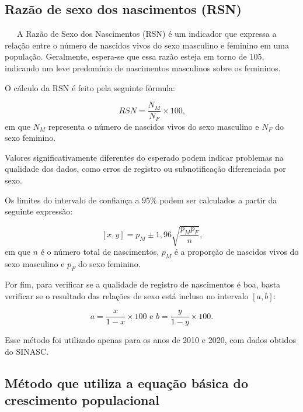 \documentclass[
  12pt,
  a4paper,
]{scrreprt}
\begin{document}
\subsection{Razão de sexo dos nascimentos
(RSN)}\label{razuxe3o-de-sexo-dos-nascimentos-rsn}

~~~A Razão de Sexo dos Nascimentos (RSN) é um indicador que expressa a
relação entre o número de nascidos vivos do sexo masculino e feminino em
uma população. Geralmente, espera-se que essa razão esteja em torno de
105, indicando um leve predomínio de nascimentos masculinos sobre os
femininos.

\vspace{12pt}

O cálculo da RSN é feito pela seguinte fórmula:

\[
RSN = \frac{N_M}{N_F} \times 100 \text{,}
\] em que \(N_M\) representa o número de nascidos vivos do sexo
masculino e \(N_F\) do sexo feminino.

\vspace{12pt}

Valores significativamente diferentes do esperado podem indicar
problemas na qualidade dos dados, como erros de registro ou
subnotificação diferenciada por sexo.

\vspace{12pt}

Os limites do intervalo de confiança a \(95\%\) podem ser calculados a
partir da seguinte expressão:

\[
\left[x, y\right] = p_{M} \pm 1,96 \sqrt{\frac{p_{M}p_{F}}{n}} \text{,}
\] em que \(n\) é o número total de nascimentos, \(p_{M}\) é a proporção
de nascidos vivos do sexo masculino e \(p_{F}\) do sexo feminino.

\vspace{12pt}

Por fim, para verificar se a qualidade de registro de nascimentos é boa,
basta verificar se o resultado das relações de sexo está incluso no
intervalo \(\left[a, b\right]\):

\[
a = \frac{x}{1 - x} \times 100 \text{ e } b = \frac{y}{1-y}\times 100\text{.}
\]

\vspace{12pt}

Esse método foi utilizado apenas para os anos de 2010 e 2020, com dados
obtidos do SINASC.

\subsection{Método que utiliza a equação básica do crescimento
populacional}\label{muxe9todo-que-utiliza-a-equauxe7uxe3o-buxe1sica-do-crescimento-populacional}
\end{document}
